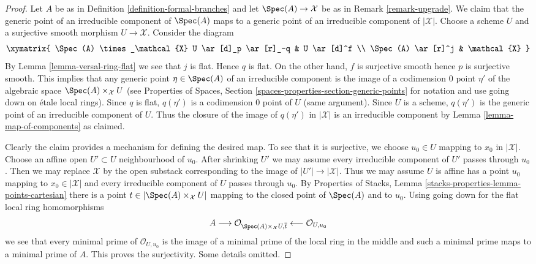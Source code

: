 \begin{proof}
Let $A$ be as in Definition \ref{definition-formal-branches} and
let $\Spec(A) \to \mathcal{X}$ be as in Remark \ref{remark-upgrade}.
We claim that the generic point of an irreducible component of
$\Spec(A)$ maps to a generic point of an irreducible component
of $|\mathcal{X}|$. Choose a scheme $U$ and a surjective
smooth morphism $U \to \mathcal{X}$. Consider the diagram
$$
\xymatrix{
\Spec(A) \times_\mathcal{X} U \ar[d]_p \ar[r]_-q & U \ar[d]^f \\
\Spec(A) \ar[r]^j & \mathcal{X}
}
$$
By Lemma \ref{lemma-versal-ring-flat} we see that $j$ is flat.
Hence $q$ is flat. On the other hand, $f$ is surjective smooth
hence $p$ is surjective smooth. This implies that any generic point
$\eta \in \Spec(A)$ of an irreducible component is the image of a
codimension $0$ point $\eta'$ of the algebraic space
$\Spec(A) \times_\mathcal{X} U$ (see
Properties of Spaces, Section \ref{spaces-properties-section-generic-points}
for notation and use going down on \'etale local rings).
Since $q$ is flat, $q(\eta')$ is a codimension $0$ point of $U$
(same argument).
Since $U$ is a scheme, $q(\eta')$ is the generic point
of an irreducible component of $U$. Thus the closure of the image
of $q(\eta')$ in $|\mathcal{X}|$ is an irreducible component
by Lemma \ref{lemma-map-of-components} as claimed.

\medskip\noindent
Clearly the claim provides a mechanism for defining the desired map.
To see that it is surjective, we choose $u_0 \in U$ mapping to
$x_0$ in $|\mathcal{X}|$. Choose an affine open $U' \subset U$
neighbourhood of $u_0$. After shrinking $U'$ we may assume every
irreducible component of $U'$ passes through $u_0$. Then we may
replace $\mathcal{X}$ by the open substack corresponding to the
image of $|U'| \to |\mathcal{X}|$. Thus we may assume $U$ is affine
has a point $u_0$ mapping to $x_0 \in |\mathcal{X}|$
and every irreducible component of $U$ passes through $u_0$.
By Properties of Stacks, Lemma
\ref{stacks-properties-lemma-points-cartesian}
there is a point $t \in |\Spec(A) \times_\mathcal{X} U|$
mapping to the closed point of $\Spec(A)$ and to $u_0$.
Using going down for the flat local ring homomorphisms
$$
A \longrightarrow
\mathcal{O}_{\Spec(A) \times_\mathcal{X} U, \overline{t}}
\longleftarrow \mathcal{O}_{U, u_0}
$$
we see that every minimal prime of $\mathcal{O}_{U, u_0}$
is the image of a minimal prime of the local ring in the middle
and such a minimal prime maps to a minimal prime of $A$.
This proves the surjectivity. Some details omitted.
\end{proof}

